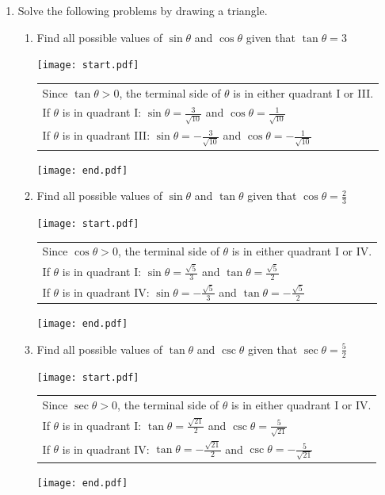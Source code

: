 \documentclass[12pt]{article}
\begin{document}
\begin{enumerate}

\item Solve the following problems by drawing a triangle.

\begin{enumerate}

\item Find all possible values of $\sin{\theta}$ and $\cos{\theta}$ given that $\tan{\theta}=3$

\texttt{[image: start.pdf]}
{\begin{tabular}{l}
Since $\tan{\theta}>0$, the terminal side of $\theta$ is in either quadrant I or III.\\
If $\theta$ is in quadrant I: $\displaystyle \sin{\theta}=\frac{3}{\sqrt{10}}$ and $\displaystyle \cos{\theta}=\frac{1}{\sqrt{10}}$\\
If $\theta$ is in quadrant III: $\displaystyle \sin{\theta}=-\frac{3}{\sqrt{10}}$ and $\displaystyle \cos{\theta}=-\frac{1}{\sqrt{10}}$
\end{tabular}
}
\texttt{[image: end.pdf]}


\item Find all possible values of $\sin{\theta}$ and $\tan{\theta}$ given that $\displaystyle \cos{\theta}=\frac{2}{3}$

\texttt{[image: start.pdf]}
{\begin{tabular}{l}
Since $\cos{\theta}>0$, the terminal side of $\theta$ is in either quadrant I or IV.\\
If $\theta$ is in quadrant I: $\displaystyle \sin{\theta}=\frac{\sqrt{5}}{3}$ and $\displaystyle \tan{\theta}=\frac{\sqrt{5}}{2}$\\
If $\theta$ is in quadrant IV: $\displaystyle \sin{\theta}=-\frac{\sqrt{5}}{3}$ and $\displaystyle \tan{\theta}=-\frac{\sqrt{5}}{2}$\\
\end{tabular}
}
\texttt{[image: end.pdf]}


\item Find all possible values of $\tan{\theta}$ and $\csc{\theta}$ given that $\displaystyle \sec{\theta}=\frac{5}{2}$

\texttt{[image: start.pdf]}
{\begin{tabular}{l}
Since $\sec{\theta}>0$, the terminal side of $\theta$ is in either quadrant I or IV.\\
If $\theta$ is in quadrant I: $\displaystyle \tan{\theta}=\frac{\sqrt{21}}{2}$ and $\displaystyle \csc{\theta}=\frac{5}{\sqrt{21}}$\\
If $\theta$ is in quadrant IV: $\displaystyle \tan{\theta}=-\frac{\sqrt{21}}{2}$ and $\displaystyle \csc{\theta}=-\frac{5}{\sqrt{21}}$\\
\end{tabular}
}
\texttt{[image: end.pdf]}



\end{enumerate}
\end{enumerate}
\end{document}
